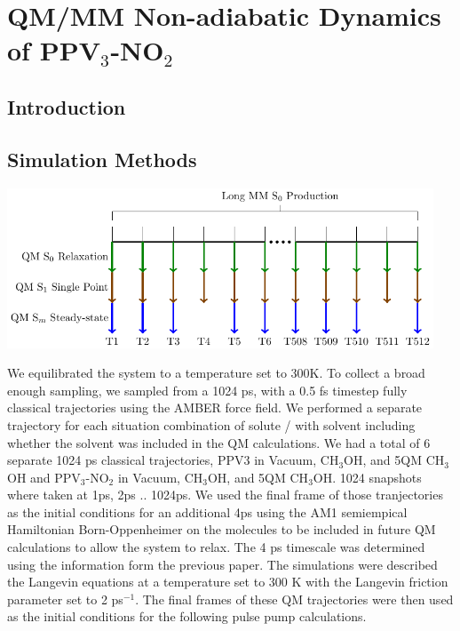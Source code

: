 \chapter{QM/MM Non-adiabatic Dynamics of PPV\(_3\)-NO\(_2\)}

\section{Introduction}

\section{Simulation Methods}

\noindent
\begin{minipage}[c]{\textwidth}
  \centering
  \includegraphics[width=5in]{../Paper2/scripted_diagrams/simulations-1.png}
  \label{fig:nonadiabaticSimulation}
\end{minipage}\bigskip

We equilibrated the system to a temperature set to 300K. To collect a broad
enough sampling, we sampled from a 1024 ps, with a 0.5 fs timestep fully
classical trajectories using the AMBER force field. We performed a separate
trajectory for each situation combination of solute / with solvent including
whether the solvent was included in the QM calculations. We had a total of 6
separate 1024 ps classical trajectories, PPV3 in Vacuum, CH\(_3\)OH, and 5QM CH\(_3\)OH
and PPV\(_3\)-NO\(_2\) in Vacuum, CH\(_3\)OH, and 5QM CH\(_3\)OH. 1024 snapshots where taken at
1ps, 2ps .. 1024ps. We used the final frame of those tranjectories as the
initial conditions for an additional 4ps using the AM1 semiempical Hamiltonian
Born-Oppenheimer on the molecules to be included in future QM calculations to
allow the system to relax. The 4 ps timescale was determined using the
information form the previous paper. The simulations were described the Langevin
equations at a temperature set to 300 K with the Langevin friction parameter set
to 2 ps\(^{-1}\). The final frames of these QM trajectories were then used as the
initial conditions for the following pulse pump calculations.

